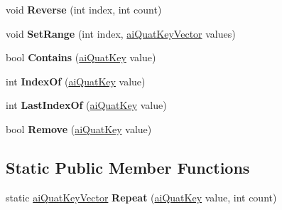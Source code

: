 \begin{DoxyCompactItemize}
\item 
\hypertarget{classai_quat_key_vector_a164b44c51e03c8771c95741728362001}{void {\bfseries Reverse} (int index, int count)}\label{classai_quat_key_vector_a164b44c51e03c8771c95741728362001}

\item 
\hypertarget{classai_quat_key_vector_ac4890cced673d01cb2448ca19d9a521e}{void {\bfseries Set\+Range} (int index, \hyperlink{classai_quat_key_vector}{ai\+Quat\+Key\+Vector} values)}\label{classai_quat_key_vector_ac4890cced673d01cb2448ca19d9a521e}

\item 
\hypertarget{classai_quat_key_vector_aa7b6715ae70f17091c08acb711ce4544}{bool {\bfseries Contains} (\hyperlink{structai_quat_key}{ai\+Quat\+Key} value)}\label{classai_quat_key_vector_aa7b6715ae70f17091c08acb711ce4544}

\item 
\hypertarget{classai_quat_key_vector_a6809a04cb174aa1f565b689e54192907}{int {\bfseries Index\+Of} (\hyperlink{structai_quat_key}{ai\+Quat\+Key} value)}\label{classai_quat_key_vector_a6809a04cb174aa1f565b689e54192907}

\item 
\hypertarget{classai_quat_key_vector_a391e548a026cf96f8694c5bbfc400edf}{int {\bfseries Last\+Index\+Of} (\hyperlink{structai_quat_key}{ai\+Quat\+Key} value)}\label{classai_quat_key_vector_a391e548a026cf96f8694c5bbfc400edf}

\item 
\hypertarget{classai_quat_key_vector_a78f6e5da6f267ede02797cbbbb880c69}{bool {\bfseries Remove} (\hyperlink{structai_quat_key}{ai\+Quat\+Key} value)}\label{classai_quat_key_vector_a78f6e5da6f267ede02797cbbbb880c69}

\end{DoxyCompactItemize}
\subsection*{Static Public Member Functions}
\begin{DoxyCompactItemize}
\item 
\hypertarget{classai_quat_key_vector_a49f5b843370b4cd1e70c3769c0827a89}{static \hyperlink{classai_quat_key_vector}{ai\+Quat\+Key\+Vector} {\bfseries Repeat} (\hyperlink{structai_quat_key}{ai\+Quat\+Key} value, int count)}\label{classai_quat_key_vector_a49f5b843370b4cd1e70c3769c0827a89}

\end{DoxyCompactItemize}
